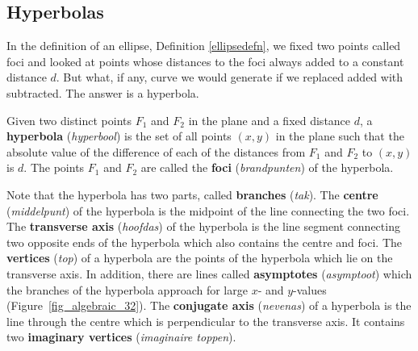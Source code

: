 \subsection{Hyperbolas}
In the definition of an ellipse, Definition \ref{ellipsedefn}, we fixed two points called foci and looked at points whose distances to the foci always added to a constant distance $d$.  But what, if any, curve we would generate if we replaced added with subtracted.  The answer is a hyperbola.

\begin{definition}[Hyperbola] \label{hyperboladefn} 
Given two distinct points $F_1$ and $F_2$ in the plane and a fixed distance $d$, a \textbf{hyperbola} (\textit{hyperbool})
 is the set of all points $(x, y)$ in the plane such that the absolute value of the difference of each of the distances from $F_1$ and $F_2$  to $(x, y)$ is $d$. The points $F_1$ and $F_2$ are called the \textbf{foci} (\textit{brandpunten})  of the hyperbola.

\end{definition} 


Note that the hyperbola has two parts, called  \textbf{branches} (\textit{tak}).  The \textbf{centre} (\textit{middelpunt}) of the hyperbola is the midpoint of the line connecting the two foci.  The \textbf{transverse axis} (\textit{hoofdas}) of the hyperbola is the line segment connecting two opposite ends of the hyperbola which also contains the centre and foci.  The \textbf{vertices} (\textit{top}) of a hyperbola are the points of the hyperbola which lie on the transverse axis.  In addition, there are lines called \textbf{asymptotes} (\textit{asymptoot}) which the branches of the hyperbola approach for large $x$- and $y$-values (Figure~\ref{fig_algebraic_32}).  The \textbf{conjugate axis} (\textit{nevenas}) of a hyperbola is the line through the centre which is perpendicular to the transverse axis. It contains two \textbf{imaginary vertices} (\textit{imaginaire toppen}).

